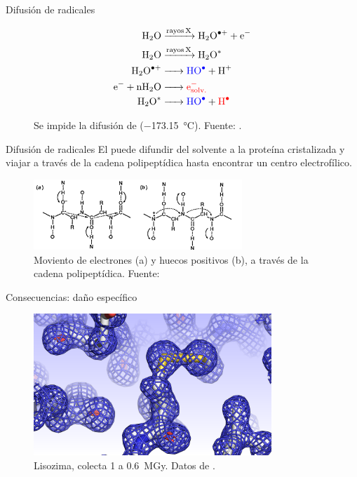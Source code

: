\documentclass{beamer}
\begin{document}
\begin{frame}{Difusión de radicales}
 \begin{figure}
  \begin{align*}
  \ce{H2O &->[rayos X] H2O^{.+} + e^{-}} \\
  \ce{H2O &->[rayos X] H2O^{*}}          \\
  \ce{H2O^{.+} &-> \color{blue}HO^{.} + H^{+}} \\
  \ce{e^{-} + nH2O &-> \color{red}e^{-}_{solv.}} \\
  \ce{H2O^{*} &-> \color{blue}HO^{.} + \color{red}H^{.}}
  \end{align*} 
  \caption{Se impide la difusión de  (\SI{-173.15}{\celsius}). Fuente: \cite{Owen2012a}.}  
  \label{fig:owen2012a}
 \end{figure}
\end{frame}
\begin{frame}{Difusión de radicales}
El  puede difundir del solvente a la proteína cristalizada y viajar a través de la cadena polipeptídica hasta encontrar un centro electrofílico. 
 \begin{figure}[h]
  \centering
  \includegraphics[width=0.7\textwidth]{symons92.png}
  \caption{Moviento de electrones (a) y huecos positivos (b), a través de la cadena polipeptídica. Fuente: \cite{Symons1992}}
  \label{fig:symons92}
 \end{figure}
\end{frame}
\begin{frame}{Consecuencias: daño específico}
 \begin{figure}[h]
  \centering
  \includegraphics[width=0.8\textwidth]{before.png}
  \caption{Lisozima, colecta 1 a \SI{0.6}{\mega\gray}. Datos de \cite{Nanao2005}.}
 \end{figure}
\end{frame}
\end{document}
